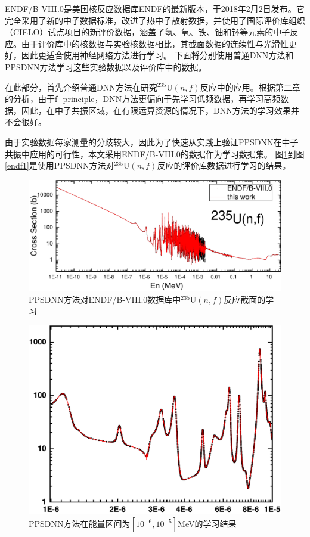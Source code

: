ENDF/B-VIII.0是美国核反应数据库ENDF的最新版本，于2018年2月2日发布\cite{Brown2018}。它完全采用了新的中子数据标准，改进了热中子散射数据，并使用了国际评价库组织（CIELO）试点项目的新评价数据，涵盖了氢、氧、铁、铀和钚等元素的中子反应\cite{Sobes2021}。由于评价库中的核数据与实验核数据相比，其截面数据的连续性与光滑性更好，因此更适合使用神经网络方法进行学习。
下面将分别使用普通DNN方法和PPSDNN方法学习这些实验数据以及评价库中的数据。



在此部分，首先介绍普通DNN方法在研究$^{235}\text{U}(n,f)$反应中的应用。根据第二章的分析，由于f- principle，DNN方法更偏向于先学习低频数据，再学习高频数据，因此，在中子共振区域，在有限运算资源的情况下，DNN方法的学习效果并不会很好。

由于实验数据每家测量的分歧较大，因此为了快速从实践上验证PPSDNN在中子共振中应用的可行性，本文采用ENDF/B-VIII.0的数据作为学习数据集。
图\ref{endftrain}到图\ref{endf1}是使用PPSDNN方法对$^{235}\text{U}(n,f)$反应的评价库数据进行学习的结果。
\begin{figure}[htbp!]
  \centering
  \includegraphics[width=0.94\linewidth]{figures/endftrain/endftrain.pdf}
  \caption{PPSDNN方法对ENDF/B-VIII.0数据库中$^{235}\text{U}(n,f)$反应截面的学习}
  \label{endftrain}
\end{figure}
\begin{figure}[htbp!]
  \centering
  \includegraphics[width=0.84\linewidth]{figures/endftrain/G6.pdf}
  \caption{PPSDNN方法在能量区间为$[10^{-6},10^{-5}]$MeV的学习结果}
  \label{endf6}
\end{figure}
